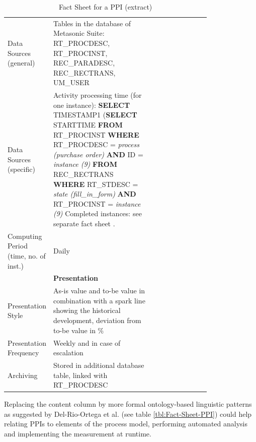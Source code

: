 \begin{table}[htbp]
\begin{tabular}[t]{@{}l p{0.5\linewidth} p{0.3\linewidth} @{}}
		\\
		Data Sources (general) & Tables in the database of Metasonic Suite:
		RT\_PROCDESC, RT\_PROCINST, REC\_PARADESC, REC\_RECTRANS, UM\_USER
		\\
		Data Sources (specific) & Activity processing time (for one instance):\newline
		\textbf{SELECT} TIMESTAMP1  \newline
		(\textbf{SELECT} STARTTIME \newline
		\textbf{FROM} RT\_PROCINST \newline
		\textbf{WHERE} RT\_PROCDESC = \textit{process (purchase order)}\newline
		\textbf{AND} ID = \textit{instance (9)}\newline
		\textbf{FROM} REC\_RECTRANS\newline
		\textbf{WHERE} RT\_STDESC = \textit{\textit{state (fill\_in\_form)}}\newline
		\textbf{AND} RT\_PROCINST = \textit{instance (9)}
		Completed instances: see separate fact sheet .
		\\
		Computing Period (time, no. of inst.) & Daily
		\\
		& \textbf{Presentation}
		\\
		Presentation Style & As-is value and to-be value in combination with a spark line showing the historical development, deviation from to-be value in \%
		\\
		Presentation Frequency & Weekly and in case of escalation
		\\
		Archiving & Stored in additional database table, linked with RT\_PROCDESC
		\\
		
\bottomrule
\end{tabular}
\caption{Fact Sheet for a PPI (extract)}
\label{tbl:Fact-Sheet}
\end{table}

Replacing the content column by more formal ontology-based linguistic patterns as suggested by Del-Rio-Ortega et al. (see table \ref{tbl:Fact-Sheet-PPI}) could help relating PPIs to elements of the process model, performing automated analysis \cite{article:ProcessPerfInd} and implementing the measurement at runtime. 

